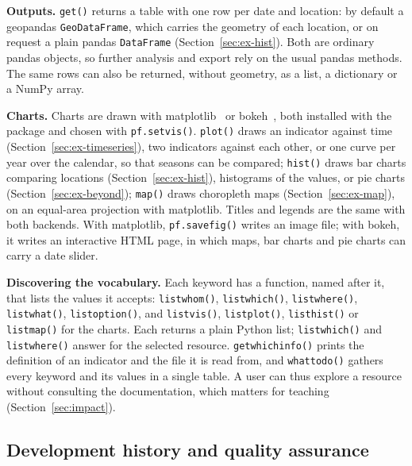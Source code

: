 \documentclass[preprint,12pt,a4paper]{elsarticle}
\begin{document}
\textbf{Outputs.} \texttt{get()} returns a table with one row per date and
location: by default a geopandas \texttt{GeoDataFrame}, which carries the
geometry of each location, or on request a plain pandas \texttt{DataFrame}
(Section~\ref{sec:ex-hist}). Both are ordinary pandas objects, so further
analysis and export rely on the usual pandas methods. The same rows can also
be returned, without geometry, as a list, a dictionary or a NumPy array.

\textbf{Charts.} Charts are drawn with matplotlib~\cite{hunter2007} or
bokeh~\cite{bokeh}, both installed with the package and chosen with
\texttt{pf.setvis()}. \texttt{plot()} draws an indicator against time
(Section~\ref{sec:ex-timeseries}), two indicators against each other, or one
curve per year over the calendar, so that seasons can be compared; \texttt{hist()} draws bar charts comparing locations (Section~\ref{sec:ex-hist}), histograms of the values, or pie
charts (Section~\ref{sec:ex-beyond}); \texttt{map()} draws choropleth maps
(Section~\ref{sec:ex-map}), on an equal-area projection with matplotlib.
Titles and legends are the same with both backends. With matplotlib,
\texttt{pf.savefig()} writes an image file; with bokeh, it writes an
interactive HTML page, in which maps, bar charts and pie charts can carry a
date slider.


\textbf{Discovering the vocabulary.} Each keyword has a function, named after
it, that lists the values it accepts: \texttt{listwhom()},
\texttt{listwhich()}, \texttt{listwhere()}, \texttt{listwhat()},
\texttt{listoption()}, and \texttt{listvis()}, \texttt{listplot()},
\texttt{listhist()} or \texttt{listmap()} for the charts. Each returns a plain
Python list; \texttt{listwhich()} and \texttt{listwhere()} answer for the
selected resource. \texttt{getwhichinfo()} prints the definition of an indicator and the file it is read from, and \texttt{whattodo()} gathers every keyword and its
values in a single table. A user can thus explore a resource without
consulting the documentation, which matters for teaching
(Section~\ref{sec:impact}).


\subsection{Development history and quality assurance}
\label{sec:history}
\end{document}
